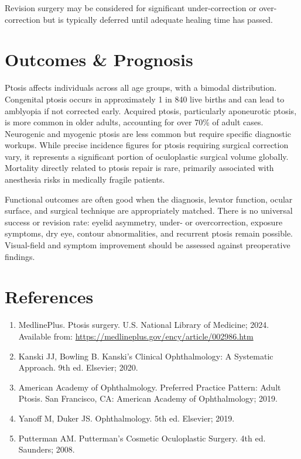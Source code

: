 Revision surgery may be considered for significant under-correction or over-correction but is typically deferred until adequate healing time has passed.

\section*{Outcomes \& Prognosis}
Ptosis affects individuals across all age groups, with a bimodal distribution. Congenital ptosis occurs in approximately 1 in 840 live births and can lead to amblyopia if not corrected early. Acquired ptosis, particularly aponeurotic ptosis, is more common in older adults, accounting for over 70\% of adult cases. Neurogenic and myogenic ptosis are less common but require specific diagnostic workups. While precise incidence figures for ptosis requiring surgical correction vary, it represents a significant portion of oculoplastic surgical volume globally. Mortality directly related to ptosis repair is rare, primarily associated with anesthesia risks in medically fragile patients.

Functional outcomes are often good when the diagnosis, levator function, ocular surface, and surgical technique are appropriately matched. There is no universal success or revision rate: eyelid asymmetry, under- or overcorrection, exposure symptoms, dry eye, contour abnormalities, and recurrent ptosis remain possible. Visual-field and symptom improvement should be assessed against preoperative findings.

\section*{References}
\begin{enumerate}
  \item MedlinePlus. Ptosis surgery. U.S. National Library of Medicine; 2024. Available from: \url{https://medlineplus.gov/ency/article/002986.htm}
  \item Kanski JJ, Bowling B. Kanski's Clinical Ophthalmology: A Systematic Approach. 9th ed. Elsevier; 2020.
  \item American Academy of Ophthalmology. Preferred Practice Pattern: Adult Ptosis. San Francisco, CA: American Academy of Ophthalmology; 2019.
  \item Yanoff M, Duker JS. Ophthalmology. 5th ed. Elsevier; 2019.
  \item Putterman AM. Putterman's Cosmetic Oculoplastic Surgery. 4th ed. Saunders; 2008.
\end{enumerate}

\clearpage
